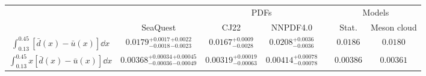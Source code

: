 \renewcommand{\arraystretch}{1.5}
\begin{tabular}{ccccccc}
\hline \hline
 &          & \multicolumn{2}{c}{PDFs} & & \multicolumn{2}{c}{Models} \\ \cline{3-4} \cline{6-7}
 & SeaQuest &CJ22     & NNPDF4.0     & & Stat.     & Meson cloud    \\ \hline
$\int^{0.45}_{0.13} \left[\bar{d}\left(x\right) - \bar{u}\left(x\right) \right]\dd{x}$ &
  $0.0179_{-0.0018}^{+0.0017} {}_{-0.0023}^{+0.0022}$ &
  $0.0167^{+0.0009}_{-0.0028}$ &
  $0.0208^{+0.0036}_{-0.0036}$ & &
  $0.0186$ &
  $0.0180$ \\
$\int^{0.45}_{0.13} x\left[\bar{d}\left(x\right) - \bar{u}\left(x\right) \right]\dd{x}$ &
  $0.00368_{-0.00036}^{+0.00034} {}_{-0.00049}^{+0.00045}$ &
  $0.00319^{+0.00019}_{-0.00063}$ &
  $0.00414^{+0.00078}_{-0.00078}$ & &
  $0.00386$ &
  $0.00361$ \\ \hline \hline
\end{tabular}
